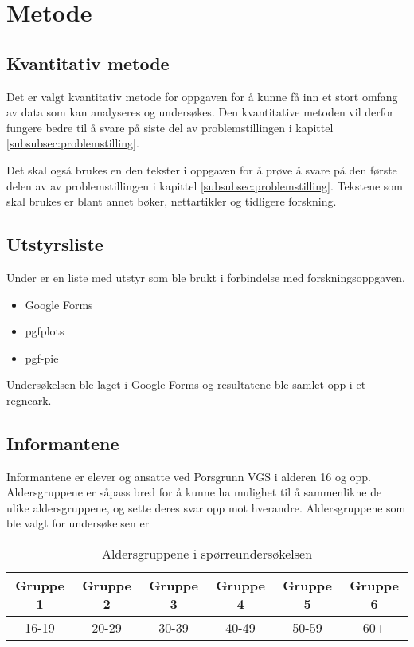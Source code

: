 \section{Metode}

\subsection{Kvantitativ metode}
Det er valgt kvantitativ metode for oppgaven for å kunne få inn et stort omfang av data som kan analyseres og undersøkes. Den kvantitative metoden vil derfor fungere bedre til å svare på siste del av problemstillingen i kapittel \ref{subsubsec:problemstilling}.

Det skal også brukes en den tekster i oppgaven for å prøve å svare på den første delen av av problemstillingen i kapittel \ref{subsubsec:problemstilling}. Tekstene som skal brukes er blant annet bøker, nettartikler og tidligere forskning.

\subsection{Utstyrsliste}
Under er en liste med utstyr som ble brukt i forbindelse med forskningsoppgaven.
\begin{itemize}
    \item Google Forms
    \item pgfplots
    \item pgf-pie
\end{itemize}
Undersøkelsen ble laget i Google Forms og resultatene ble samlet opp i et regneark.

\subsection{Informantene}
Informantene er elever og ansatte ved Porsgrunn VGS i alderen 16 og opp. Aldersgruppene er såpass bred for å kunne ha mulighet til å sammenlikne de ulike aldersgruppene, og sette deres svar opp mot hverandre. Aldersgruppene som ble valgt for undersøkelsen er

\begin{table}[h]
    \begin{center}
        \begin{tabular}{|c|c|c|c|c|c|}
            \hline
            Gruppe 1 & Gruppe 2 & Gruppe 3 & Gruppe 4 & Gruppe 5 & Gruppe 6 \\
            \hline
            16-19 & 20-29 & 30-39 & 40-49 & 50-59 & 60+ \\
            \hline
        \end{tabular}
        \caption{Aldersgruppene i spørreundersøkelsen}
    \end{center}
\end{table}

